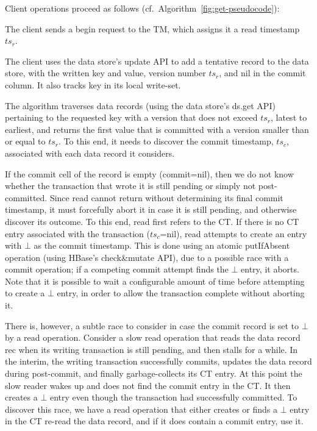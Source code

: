 \noindent
Client operations proceed as follows (cf.~Algorithm~\ref{fig:get-pseudocode}):

The client sends a begin request to the TM, which assigns it a read timestamp $ts_r$.

The client uses the data store's update API to add a tentative record to the data store, with the written key and value, 
version number $ts_r$, and nil in the commit column.
It also tracks key in its local write-set.

The algorithm traverses data  records (using the data store's ds.get API) pertaining
to the requested key with a version that does not exceed $ts_r$, latest to earliest, and returns the first value that is committed
with a  version smaller than or equal to $ts_r$. To this end, it needs to discover the commit timestamp, $ts_c$, associated with
each data record it considers. 

If the commit cell of the record is empty (commit=nil), then we do not know whether the transaction that wrote it is still pending 
or simply not post-committed. Since read cannot return without determining its final commit timestamp, 
it must forcefully abort it in case it is still pending, and otherwise discover its outcome.
To this end, read first refers to the CT.
If there is no CT entry associated with the transaction ($ts_c$=nil), 
read attempts to create an entry with $\bot$ as the commit timestamp. 
This is done using an atomic putIfAbsent operation (using HBase's check\&mutate API), due to a possible 
race with a commit operation; if a competing commit attempt finds the   $\bot$ entry, it  aborts. 
Note that it is possible  to wait a configurable amount of time before attempting to create a $\bot$ entry, in
order to allow the transaction complete without aborting it.

There is, however, a subtle race to consider in case the commit record is set to $\bot$ by a read operation. 
Consider a slow read operation that reads the data record rec when its writing transaction is still pending, and then stalls
for a while. In the interim, the writing transaction successfully commits, updates the data record during post-commit, 
and finally garbage-collects its  CT entry.  At this point the slow reader wakes up 
and does not find the commit entry in the CT. It then creates a $\bot$ entry even though the transaction had successfully committed.
To discover this race, we have a read operation that either creates or finds a $\bot$ entry in the CT re-read the data record, and 
if it does contain a commit entry, use it. 

